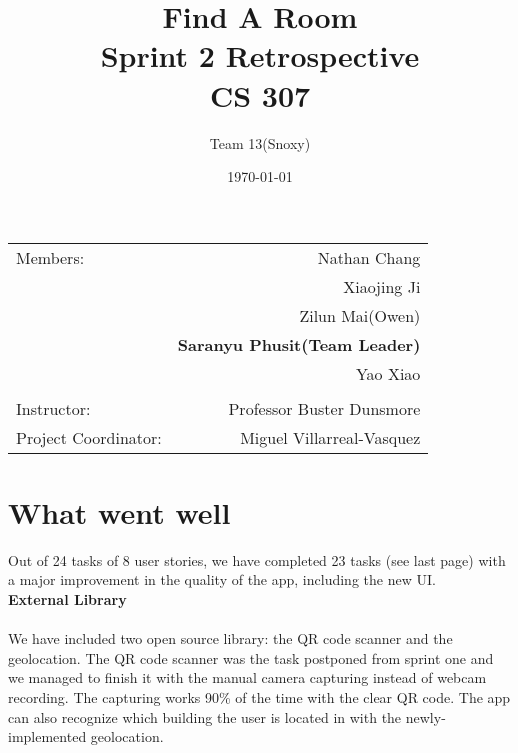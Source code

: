 \documentclass[12pt]{article}
\title{\textbf{Find A Room} \\ Sprint 2 Retrospective \\ CS 307} %
\author{Team \textsc{13}(Snoxy)} %
\date{\today} %
\begin{document}
\maketitle %

\begin{center}
\begin{tabular}{l r}
Members: & Nathan Chang \\ %
& Xiaojing Ji \\
& Zilun Mai(Owen) \\
& \textbf{Saranyu Phusit(Team Leader)} \\
& Yao Xiao \\
\\
\bigskip
Instructor: & Professor Buster Dunsmore \\%
Project Coordinator: & Miguel Villarreal-Vasquez %

\end{tabular}
\end{center}

\newpage




\newpage
\section{What went well}

Out of 24 tasks of 8 user stories, we have completed 23 tasks (see last page) with a major improvement in the quality of the app, including the new UI.  \\

\textbf{External Library} \\ \\

We have included two open source library: the QR code scanner and the geolocation. The QR code scanner was the task postponed from sprint one and we managed to finish it with the manual camera capturing instead of webcam recording. The capturing works 90\% of the time with the clear QR code. The app can also recognize which building the user is located in with the newly-implemented geolocation.   \\
\end{document}
